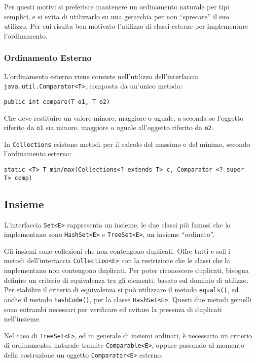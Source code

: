 \documentclass{article}
\numberwithin{equation}{subsection}
\begin{document}
Per questi motivi si preferisce mantenere un ordinamento naturale per tipi semplici, e si evita di utilizzarlo su una gerarchia per non ``sprecare'' il suo utilizzo. Per cui 
risulta ben motivato l'utilizzo di classi esterne per implementare l'ordinamento. 

\subsubsection{Ordinamento Esterno}

L'ordinamento esterno viene consiste nell'utilizzo dell'interfaccia \verb|java.util.Comparator<T>|, composta da un'unico metodo:
\begin{verbatim}
public int compare(T o1, T o2)
\end{verbatim}
Che deve restituire un valore minore, maggiore o uguale, a seconda se l'oggetto riferito da \verb|o1| sia minore, maggiore o uguale all'oggetto riferito da \verb|o2|. 

In \verb|Collections| esistono metodi per il calcolo del massimo e del minimo, secondo l'ordinamento esterno:
\begin{verbatim}
static <T> T min/max(Collections<? extends T> c, Comparator <? super T> comp)
\end{verbatim}

\subsection{Insieme}


L'interfaccia \verb|Set<E>| rappresenta un insieme, le due classi più famosi che lo implementano sono \verb|HashSet<E>| e \verb|TreeSet<E>|, un insieme ``ordinato''. 

Gli insiemi sono collezioni che non contengono duplicati. Offre tutti e soli i metodi dell'interfaccia \verb|Collection<E>| con la restrizione che le classi che la 
implementano non contengono duplicati. 
Per poter riconoscere duplicati, bisogna definire un criterio di equivalenza tra gli elementi, basato sul dominio di utilizzo. 
Per stabilire il criterio di equivalenza si può utilizzare il metodo \verb|equals()|, ed anche il metodo \verb|hashCode()|, per la classe \verb|HashSet<E>|. 
Questi due metodi gemelli sono entrambi necessari per verificare ed evitare la presenza di duplicati nell'insieme. 

Nel caso di \verb|TreeSet<E>|, ed in generale di insiemi ordinati, è necessario un criterio di ordinamento, naturale tramite \verb|Comparable<E>|, oppure passando al 
momento della costruzione un oggetto \verb|Comparator<E>| esterno. 
\end{document}
